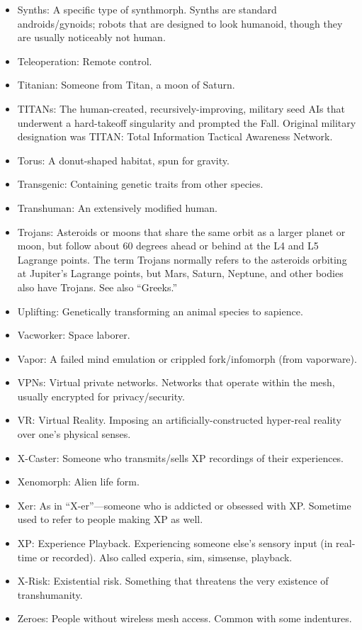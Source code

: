 \begin{itemize}
\item Synths: A specific type of synthmorph. Synths are standard  androids/gynoids; robots that are designed to look humanoid, though  they are usually noticeably not human.
\item Teleoperation: Remote control.
\item Titanian: Someone from Titan, a moon of Saturn.
\item TITANs: The human-created, recursively-improving, military seed  AIs that underwent a hard-takeoff singularity and prompted the  Fall. Original military designation was TITAN: Total Information  Tactical Awareness Network.
\item Torus: A donut-shaped habitat, spun for gravity.
\item Transgenic: Containing genetic traits from other species.
\item Transhuman: An extensively modified human.
\item Trojans: Asteroids or moons that share the same orbit as a  larger planet or moon, but follow about 60 degrees ahead or behind  at the L4 and L5 Lagrange points. The term Trojans normally refers  to the asteroids orbiting at Jupiter's Lagrange points, but Mars,  Saturn, Neptune, and other bodies also have Trojans. See also  ``Greeks.''
\item Uplifting: Genetically transforming an animal species to  sapience.
\item Vacworker: Space laborer.
\item Vapor: A failed mind emulation or crippled fork/infomorph (from  vaporware).
\item VPNs: Virtual private networks. Networks that operate within the  mesh, usually encrypted for privacy/security.
\item VR: Virtual Reality. Imposing an artificially-constructed  hyper-real reality over one's physical senses.
\item X-Caster: Someone who transmits/sells XP recordings of their  experiences.
\item Xenomorph: Alien life form.
\item Xer: As in ``X-er''—someone who is addicted or obsessed with  XP. Sometime used to refer to people making XP as well.
\item XP: Experience Playback. Experiencing someone else's sensory  input (in real-time or recorded). Also called experia, sim,  simsense, playback.
\item X-Risk: Existential risk. Something that threatens the very  existence of transhumanity.
\item Zeroes: People without wireless mesh access. Common with some  indentures. \end{itemize}

